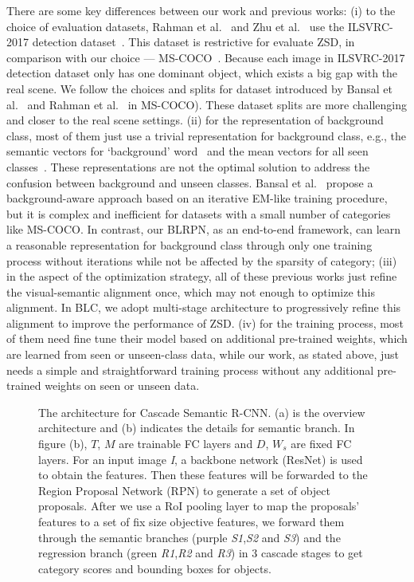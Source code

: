 \documentclass[runningheads]{llncs}
\begin{document}
There are some key differences between our work and previous works: (i) to the choice of evaluation datasets, Rahman et al.~\cite{rahman2018zero} and Zhu et al.~\cite{zhu2019zero} use the ILSVRC-2017 detection dataset~\cite{russakovsky2015imagenet}. This dataset is restrictive for evaluate ZSD, in comparison with our choice --- MS-COCO~\cite{lin2014microsoft}. Because each image in ILSVRC-2017 detection dataset only has one dominant object, which exists a big gap with the real scene. We follow the choices and splits for dataset introduced by Bansal et al.~\cite{bansal2018zero} and Rahman et al.~\cite{rahman2020improved} in MS-COCO). These dataset splits are more challenging and closer to the real scene settings. (ii) for the representation of background class, most of them just use a trivial representation for background class, e.g., the semantic vectors for ‘background’ word~\cite{bansal2018zero} and the mean vectors for all seen classes~\cite{rahman2018zero}. These representations are not the optimal solution to address the confusion between background and unseen classes. Bansal et al.~\cite{bansal2018zero} propose a background-aware approach based on an iterative EM-like training procedure, but it is complex and inefficient for datasets with a small number of categories like MS-COCO. In contrast, our BLRPN, as an end-to-end framework, can learn a reasonable representation for background class through only one training process without iterations while not be affected by the sparsity of category; (iii) in the aspect of the optimization strategy, all of these previous works just refine the visual-semantic alignment once, which may not enough to optimize this alignment. In BLC, we adopt multi-stage architecture to progressively refine this alignment to improve the performance of ZSD. (iv) for the training process, most of them need fine tune their model based on additional pre-trained weights, which are learned from seen or unseen-class data, while our work, as stated above, just needs a simple and straightforward training process without any additional pre-trained weights on seen or unseen data.
\begin{figure}[tbp]
\centering
{}
\caption{The architecture for Cascade Semantic R-CNN. (a) is the overview architecture and (b) indicates the details for semantic branch. In figure (b), {\it $T$}, {\it $M$} are trainable FC layers and {\it $D$}, {\it $W_s$} are fixed FC layers. For an input image {\it I}, a backbone network (ResNet) is used to obtain the features. Then these features will be forwarded to the Region Proposal Network (RPN) to generate a set of object proposals. After we use a RoI pooling layer to map the proposals' features to a set of fix size objective features, we forward them through the semantic branches (purple {\it {S1}},{\it {S2}} and {\it {S3}}) and the regression branch (green {\it {R1}},{\it {R2}} and {\it {R3}}) in 3 cascade stages to get category scores and bounding boxes for objects.}
\label{fig:figure1}
\end{figure}
\end{document}
